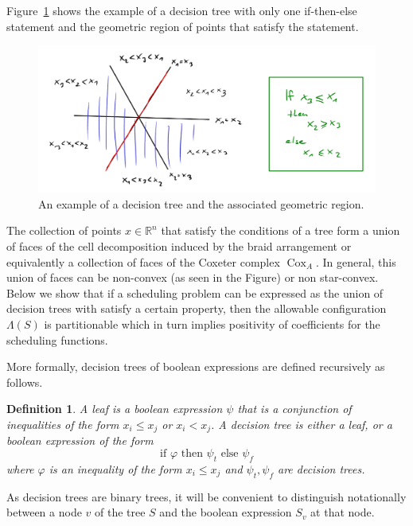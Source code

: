 \documentclass[12pt,reqno]{amsart}
\newtheorem{definition}{Definition}
\numberwithin{definition}{section}
\theoremstyle{definition}
\newcommand{\cox}{\operatorname{Cox}}
\newcommand{\allow}{\Lambda} %
\begin{document}
Figure~\ref{fig:tree} shows the example of a decision tree with only one if-then-else statement and the geometric region of points that satisfy the statement.   
\begin{figure}[h]
\includegraphics[width=13cm]{decision-tree}
\caption{An example of a decision tree and the associated geometric region.}
\label{fig:tree}
\end{figure}
The collection of points $x \in \mathbb{R}^n$ that satisfy the conditions of a tree form a union of faces of the cell decomposition induced by the braid arrangement or equivalently a collection of faces of the Coxeter complex $\cox_A$.  In general, this union of faces can be non-convex (as seen in the Figure) or non star-convex.  Below we show that if a scheduling problem can be expressed as the union of decision trees with satisfy a certain property, then the allowable configuration $\allow(S)$ is partitionable which in turn implies positivity of coefficients for the scheduling functions. 

More formally, decision trees of boolean expressions are defined recursively as follows.

\begin{definition} A \emph{leaf} is a boolean expression $\psi$ that is a conjunction of inequalities of the form $x_i \leq x_j$ or $x_i < x_j$. A \emph{decision tree} is either a leaf, or a boolean expression of the form
\[
  \text{if $\varphi$ then $\psi_t$ else $\psi_f$}
\]
where $\varphi$ is an inequality of the form $x_i \leq x_j$ and $\psi_t,\psi_f$ are decision trees.
\end{definition}

As decision trees are binary trees, it will be convenient to distinguish notationally between a node $v$ of the tree $S$ and the boolean expression $S_v$ at that node.
\end{document}
